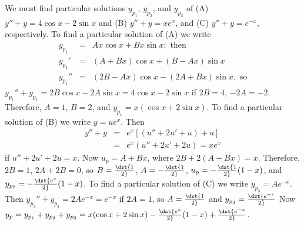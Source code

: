 \documentclass[dvips]{book}
\renewcommand{\exer}[1]{\par\medskip\;\noindent{\color{red}\bf #1.}}
\numberwithin{example}{section}
\numberwithin{equation}{section}
\numberwithin{theorem}{section}
\numberwithin{table}{section}
\numberwithin{figure}{section}
\begin{document}
\exer{5.5.28}
We must find particular solutions $y_{p_1}$, $y_{p_2}$, and $y_{p_3}$
of
(A) $y''+y=4\cos x-2\sin x$ and
(B) $y''+y=xe^x$, and
(C) $y''+y=e^{-x}$, respectively.
To find a particular solution of (A) we write
\begin{eqnarray*}
y_{p_1}&=&Ax\cos x+Bx\sin x; \mbox{ then}\\
y_{p_1}'&=&(A+Bx)\cos x+(B-Ax)\sin x\\
y_{p_1}''&=&(2B-Ax)\cos x-(2A+Bx)\sin x, \mbox{ so}
\end{eqnarray*}
$y_{p_1}''+y_{p_1}=2B\cos x-2A\sin x=4\cos x-2\sin x$ if $2B=4$,
$-2A=-2$. Therefore, $A=1$, $B=2$, and $y_{p_1}=x(\cos x+2\sin x)$.
To find a particular solution of (B) we write $y=ue^x$. Then
\begin{eqnarray*}
y''+y&=&e^x\left[(u''+2u'+u)+u\right]\\ &=&e^x(u''+2u'+2u)=xe^x
\end{eqnarray*}
if $u''+2u'+2u=x$. Now $u_p=A+Bx$, where $2B+2(A+Bx)=x$. Therefore,
$2B=1$, $2A+2B=0$, so $B=\dst{1\over2}$, $A=-\dst{1\over2}$,
$u_p=-\dst{1\over2}(1-x)$, and $y_{p_2}=-\dst{e^x\over2}(1-x)$. To
find a particular solution of (C) we write $y_{p_3}=Ae^{-x}$. Then
$y_{p_3}''+y_{p_3}=2Ae^{-x}=e^{-x}$ if $2A=1$, so $A=\dst{1\over2}$
and $y_{p_3}=\dst{e^{-x}\over2}$ Now $y_p=y_{p_1}+y_{p_2}+y_{p_3}=
x(\cos x+2\sin x)-\dst{e^x\over2}(1-x)+\dst{e^{-x}\over2}$.
\end{document}

